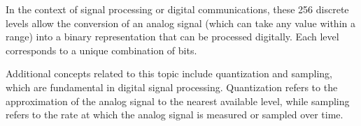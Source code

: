 In the context of signal processing or digital communications, these 256 discrete levels allow the conversion of an analog signal (which can take any value within a range) into a binary representation that can be processed digitally. Each level corresponds to a unique combination of bits.

\noindent Additional concepts related to this topic include quantization and sampling, which are fundamental in digital signal processing. Quantization refers to the approximation of the analog signal to the nearest available level, while sampling refers to the rate at which the analog signal is measured or sampled over time.

